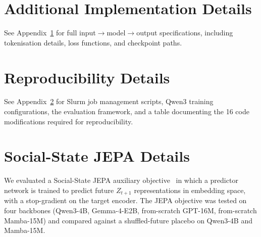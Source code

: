 \documentclass[11pt]{article}
\begin{document}
\section{Additional Implementation Details}
\label{app:dataflow}

See Appendix~\ref{app:dataflow} for full input$\rightarrow$model$\rightarrow$output specifications, including tokenisation details, loss functions, and checkpoint paths.

\section{Reproducibility Details}
\label{app:infrastructure}

See Appendix~\ref{app:infrastructure} for Slurm job management scripts, Qwen3 training configurations, the evaluation framework, and a table documenting the 16 code modifications required for reproducibility.


\section{Social-State JEPA Details}
\label{app:jepa}

We evaluated a Social-State JEPA auxiliary objective~\cite{lecun2022path,assran2023self} in which a predictor network is trained to predict future $Z_{t+1}$ representations in embedding space, with a stop-gradient on the target encoder.
The JEPA objective was tested on four backbones (Qwen3-4B, Gemma-4-E2B, from-scratch GPT-16M, from-scratch Mamba-15M) and compared against a shuffled-future placebo on Qwen3-4B and Mamba-15M.

\begin{table}[tp]
\centering
\caption{JEPA per-backbone results. Positive $\Delta$ means JEPA improves over base. Shuffled-future placebo partially replicates gains, indicating temporal structure is not the sole driver.}
\label{tab:jepa_appendix}
\footnotesize\setlength{\tabcolsep}{2pt}
\end{table}
\end{document}
